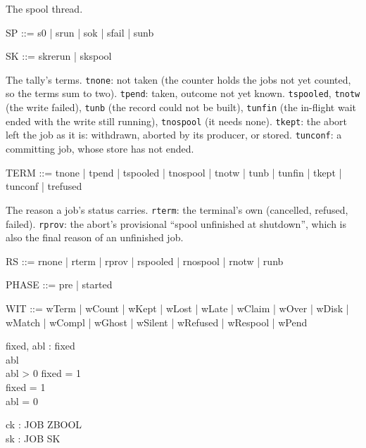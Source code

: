 \documentclass[a4paper,10pt,fleqn]{article}
\newcommand{\field}[1]{\texttt{#1}}
\begin{document}
The spool thread.

\begin{zed}
SP ::= s0 | srun | sok | sfail | sunb
\end{zed}

\begin{zed}
SK ::= skrerun | skspool
\end{zed}

The tally's terms. \field{tnone}: not taken (the counter holds the jobs not yet
counted, so the terms sum to two). \field{tpend}: taken, outcome not yet known.
\field{tspooled}, \field{tnotw} (the write failed), \field{tunb} (the record
could not be built), \field{tunfin} (the in-flight wait ended with the write still
running), \field{tnospool} (it needs none). \field{tkept}: the abort left the job
as it is: withdrawn, aborted by its producer, or stored. \field{tunconf}: a
committing job, whose store has not ended.

\begin{zed}
TERM ::= tnone | tpend | tspooled | tnospool | tnotw | tunb | tunfin
       | tkept | tunconf | trefused
\end{zed}

The reason a job's status carries. \field{rterm}: the terminal's own (cancelled,
refused, failed). \field{rprov}: the abort's provisional ``spool unfinished at
shutdown'', which is also the final reason of an unfinished job.

\begin{zed}
RS ::= rnone | rterm | rprov | rspooled | rnospool | rnotw | runb
\end{zed}

\begin{zed}
PHASE ::= pre | started
\end{zed}

\begin{zed}
WIT ::= wTerm | wCount | wKept | wLost | wLate | wClaim | wOver | wDisk
      | wMatch | wCompl | wGhost | wSilent | wRefused | wRespool | wPend
\end{zed}

\begin{axdef}
fixed, abl : \nat
\where
fixed   \\
abl   \\
abl > 0 \implies fixed = 1 \\
fixed = 1 \\
abl = 0
\end{axdef}

\begin{axdef}
ck : JOB \fun ZBOOL \\
sk : JOB \fun SK
\end{axdef}
\end{document}
